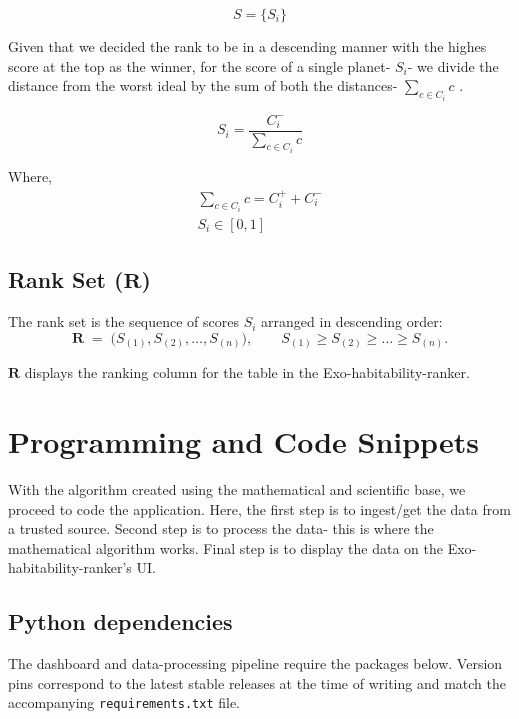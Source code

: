 \documentclass[12pt]{article}
\begin{document}
\begin{equation*}
    S = \{S_i\}
\end{equation*}\vspace{0.5em}

Given that we decided the rank to be in a descending manner with the highes score at the top as the winner, for the score of a single planet- $S_i$- we divide the distance from the worst ideal by the sum of both the distances- $\sum_{c\in C_i}c$ .

\begin{equation}
    S_i = \frac{C_i^-}{\sum_{c\in C_i}c}
\end{equation}\vspace{0.5em}

Where, 
\begin{align*}
    \sum_{c\in C_i}c = C_i^+ + C_i^- \\[1em]
    S_i\in [0,1]
\end{align*}\vspace{1em}


\subsection{Rank Set ($\mathbf{R}$)}\label{Subsec:Rank Set}
The rank set is the sequence of scores $S_i$ arranged in descending order:
\begin{equation*}
\mathbf{R} \;=\; \bigl(S_{(1)}, S_{(2)}, \dots, S_{(n)}\bigr),
\qquad
S_{(1)} \ge S_{(2)} \ge \dots \ge S_{(n)} .
\end{equation*}

 $\mathbf{R}$ displays the ranking column for the table in the Exo-habitability-ranker. 

\section{Programming and Code Snippets}\label{sec:impl}
With the algorithm created using the mathematical and scientific base, we proceed to code the application. Here, the first step is to ingest/get the data from a trusted source. Second step is to process the data- this is where the mathematical algorithm works. Final step is to display the data on the Exo-habitability-ranker's UI.

\subsection{Python dependencies}\label{dependency}
The dashboard and data-processing pipeline require the packages below.  
Version pins correspond to the latest stable releases at the time of writing and match the accompanying \texttt{requirements.txt} file.
\end{document}
